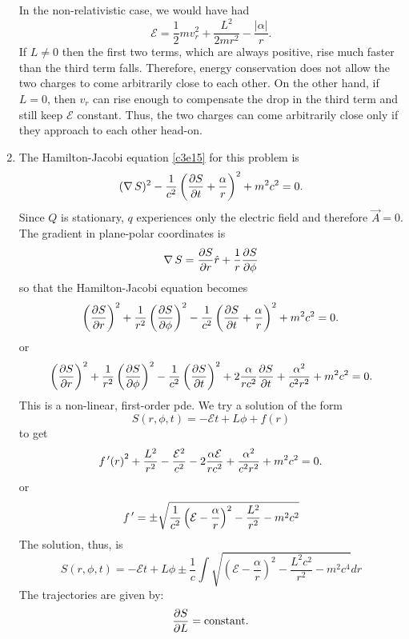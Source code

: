 \begin{enumerate}
In the non-relativistic case, we would have had
\[
\mathcal{E} = \frac{1}{2}mv_r^2 + \frac{L^2}{2mr^2} - \frac{|\alpha|}{r}.
\]
If $L \ne 0$ then the first two terms, which are always positive, rise much 
faster than the third term falls. Therefore, energy conservation does not allow 
the two charges to come arbitrarily close to each other. On the other hand, if 
$L = 0$, then $v_r$ can rise enough to compensate the drop in the third term and
still keep  $\mathcal{E}$ constant. Thus, the two charges can come arbitrarily 
close only if they approach to each other head-on.

\item The Hamilton-Jacobi equation \eqref{c3e15} for this problem is
\[
(\operatorname{\nabla} S)^2 - \frac{1}{c^2}\left(\frac{\partial{S}}{\partial{t}} + \frac{\alpha}{r}\right)^2 
+ m^2c^2 = 0.
\]
Since $Q$ is stationary, $q$ experiences only the electric field and therefore 
$\vec{A} = 0$. The gradient in plane-polar coordinates is
\begin{equation}\label{c5e66}
\operatorname{\nabla} S = \frac{\partial{S}}{\partial{r}}\hat{r} + \frac{1}{r}\frac{\partial{S}}{\partial{\phi}}
\end{equation}
so that the Hamilton-Jacobi equation becomes
\begin{equation}\label{c5e67}
\left(\frac{\partial{S}}{\partial{r}}\right)^2 + \frac{1}{r^2}\left(\frac{\partial{S}}{\partial{\phi}}\right)^2 - 
\frac{1}{c^2} \left(\frac{\partial{S}}{\partial{t}} + \frac{\alpha}{r}\right)^2 + m^2c^2 = 0.
\end{equation}
or
\[
\left(\frac{\partial{S}}{\partial{r}}\right)^2 + \frac{1}{r^2}\left(\frac{\partial{S}}{\partial{\phi}}\right)^2 - 
\frac{1}{c^2}
\left(\frac{\partial{S}}{\partial{t}}\right)^2 + 2\frac{\alpha}{rc^2}\frac{\partial{S}}{\partial{t}} + 
\frac{\alpha^2}{c^2r^2} + m^2c^2 = 0.
\]
This is a non-linear, first-order pde. We try a solution of the form
\begin{equation}\label{c5e68}
S(r, \phi, t) = -\mathcal{E}t + L\phi + f(r)
\end{equation}
to get
\[
{f^{\,\prime}(r)}^2 + \frac{L^2}{r^2} - \frac{\mathcal{E}^2}{c^2} - 
2\frac{\alpha\mathcal{E}}{rc^2} + \frac{\alpha^2}{c^2r^2} + m^2c^2 = 0.
\]
or
\[
f^{\,\prime} = \pm\sqrt{\frac{1}{c^2}\left(\mathcal{E} - \frac{\alpha}{r}\right)^2 - 
\frac{L^2}{r^2} -m^2c^2}
\]
The solution, thus, is
\begin{equation}\label{c5e69}
S(r, \phi, t) = -\mathcal{E}t + L\phi \pm 
\frac{1}{c}\int\sqrt{\left(\mathcal{E}-\frac{\alpha}{r}\right)^2-
\frac{L^2c^2}{r^2} -m^2c^4}dr
\end{equation}
The trajectories are given by: 
\begin{equation}\label{c5e70}
\frac{\partial{S}}{\partial{L}} = \text{constant.}
\end{equation}

\end{enumerate}
